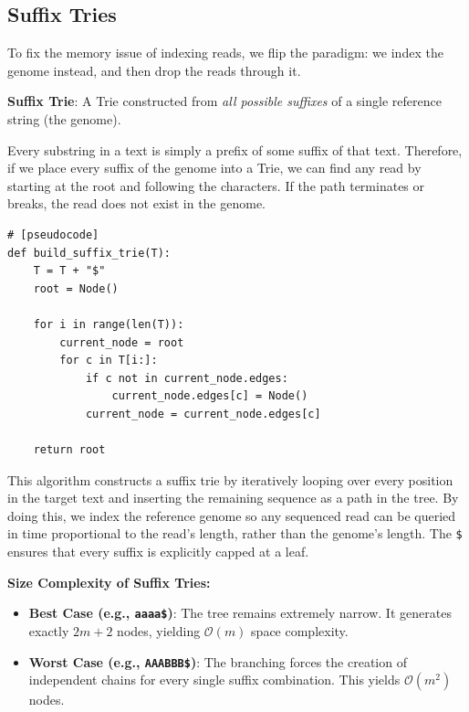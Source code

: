 \documentclass[11pt,a4paper]{article}
\newenvironment{important}{
    \vspace{1em}
    \begin{tcolorbox}[colback=blue!5!white, colframe=blue!75!black, boxrule=1pt, arc=4pt, left=10pt, right=10pt, top=10pt, bottom=10pt]
}{
    \end{tcolorbox}
    \vspace{1em}
}
\begin{document}
\subsection{Suffix Tries}

To fix the memory issue of indexing reads, we flip the paradigm: we index the genome instead, and then drop the reads through it.

\begin{important}
  \textbf{Suffix Trie}: A Trie constructed from \textit{all possible suffixes} of a single reference string (the genome).
\end{important}

Every substring in a text is simply a prefix of some suffix of that text. Therefore, if we place every suffix of the genome into a Trie, we can find any read by starting at the root and following the characters. If the path terminates or breaks, the read does not exist in the genome.

\begin{verbatim}
# [pseudocode]
def build_suffix_trie(T):
    T = T + "$"
    root = Node()
    
    for i in range(len(T)):
        current_node = root
        for c in T[i:]:
            if c not in current_node.edges:
                current_node.edges[c] = Node()
            current_node = current_node.edges[c]
            
    return root
\end{verbatim}

This algorithm constructs a suffix trie by iteratively looping over every position in the target text and inserting the remaining sequence as a path in the tree. By doing this, we index the reference genome so any sequenced read can be queried in time proportional to the read's length, rather than the genome's length. The \texttt{\$} ensures that every suffix is explicitly capped at a leaf.


\textbf{Size Complexity of Suffix Tries:}
\begin{itemize}
    \item \textbf{Best Case (e.g., \texttt{aaaa\$})}: The tree remains extremely narrow. It generates exactly $2m+2$ nodes, yielding $\mathcal{O}(m)$ space complexity.
    \item \textbf{Worst Case (e.g., \texttt{AAABBB\$})}: The branching forces the creation of independent chains for every single suffix combination. This yields $\mathcal{O}(m^2)$ nodes.
\end{itemize}
\end{document}

